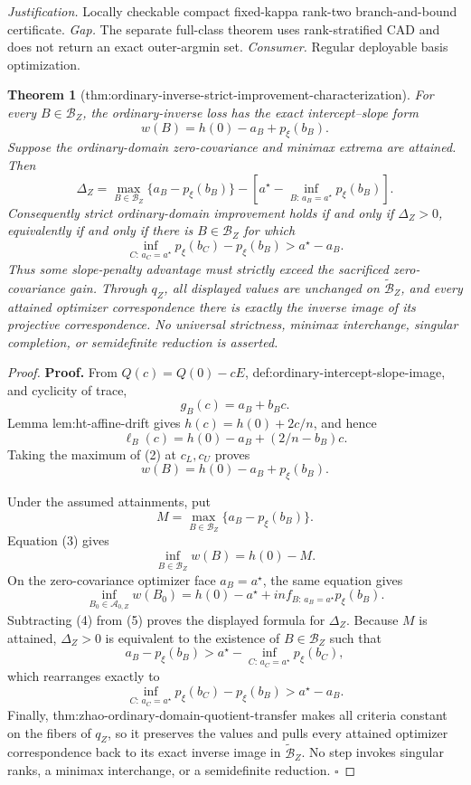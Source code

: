 \documentclass{article}
\newtheorem{theorem}{Theorem}
\begin{document}
\par\smallskip\noindent \textit{Justification.} Locally checkable compact fixed-kappa rank-two branch-and-bound certificate. \textit{Gap.} The separate full-class theorem uses rank-stratified CAD and does not return an exact outer-argmin set. \textit{Consumer.} Regular deployable basis optimization.

\begin{theorem}[thm:ordinary-inverse-strict-improvement-characterization]\label{thm:ordinary-inverse-strict-improvement-characterization}
For every \(B\in\mathcal B_Z\), the ordinary-inverse loss has the exact intercept--slope form
\[
w(B)=h(0)-a_B+p_\xi(b_B).
\]
Suppose the ordinary-domain zero-covariance and minimax extrema are attained.  Then
\[
\Delta_Z=
\max_{B\in\mathcal B_Z}\{a_B-p_\xi(b_B)\}
-\left[a^\star-\inf_{B:\,a_B=a^\star}p_\xi(b_B)\right].
\]
Consequently strict ordinary-domain improvement holds if and only if \(\Delta_Z>0\), equivalently if and only if there is \(B\in\mathcal B_Z\) for which
\[
\inf_{C:\,a_C=a^\star}p_\xi(b_C)-p_\xi(b_B)
>a^\star-a_B.
\]
Thus some slope-penalty advantage must strictly exceed the sacrificed zero-covariance gain.  Through \(q_Z\), all displayed values are unchanged on \(\widetilde{\mathcal B}_Z\), and every attained optimizer correspondence there is exactly the inverse image of its projective correspondence.  No universal strictness, minimax interchange, singular completion, or semidefinite reduction is asserted.
\end{theorem}
\begin{proof}
\textbf{Proof.}
From \(Q(c)=Q(0)-cE\), def:ordinary-intercept-slope-image, and cyclicity of trace,
\[
g_B(c)=a_B+b_Bc.
\tag{1}
\]
Lemma lem:ht-affine-drift gives \(h(c)=h(0)+2c/n\), and hence
\[
\ell_B(c)=h(0)-a_B+(2/n-b_B)c.
\tag{2}
\]
Taking the maximum of (2) at \(c_L,c_U\) proves
\[
w(B)=h(0)-a_B+p_\xi(b_B).
\tag{3}
\]

Under the assumed attainments, put
\[
M=\max_{B\in\mathcal B_Z}\{a_B-p_\xi(b_B)\}.
\]
Equation (3) gives
\[
\inf_{B\in\mathcal B_Z}w(B)=h(0)-M.
\tag{4}
\]
On the zero-covariance optimizer face \(a_B=a^\star\), the same equation gives
\[
\inf_{B_0\in\mathcal A_{0,Z}}w(B_0)
=h(0)-a^\star+inf_{B:\,a_B=a^\star}p_\xi(b_B).
\tag{5}
\]
Subtracting (4) from (5) proves the displayed formula for \(\Delta_Z\).  Because \(M\) is attained, \(\Delta_Z>0\) is equivalent to the existence of \(B\in\mathcal B_Z\) such that
\[
a_B-p_\xi(b_B)
>a^\star-\inf_{C:\,a_C=a^\star}p_\xi(b_C),
\]
which rearranges exactly to
\[
\inf_{C:\,a_C=a^\star}p_\xi(b_C)-p_\xi(b_B)
>a^\star-a_B.
\]
Finally, thm:zhao-ordinary-domain-quotient-transfer makes all criteria constant on the fibers of \(q_Z\), so it preserves the values and pulls every attained optimizer correspondence back to its exact inverse image in \(\widetilde{\mathcal B}_Z\).  No step invokes singular ranks, a minimax interchange, or a semidefinite reduction.  \(\square\)
\end{proof}
\end{document}
